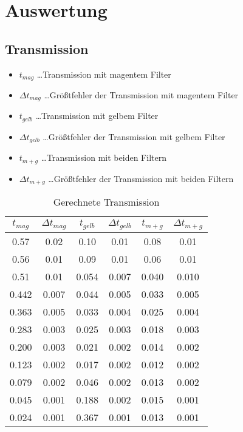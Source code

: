 \documentclass[a4paper]{article}
\begin{document}
\section{Auswertung}
\subsection{Transmission}
\begin{table}[ht]
				\centering
				\caption{Gerechnete Transmission}
        \begin{itemize}
          \item $t_{mag}$ \dots Transmission mit magentem Filter
          \item $\Delta t_{mag}$ \dots Größtfehler der Transmission mit magentem Filter
          \item $t_{gelb}$ \dots Transmission mit gelbem Filter 
          \item $\Delta t_{gelb}$ \dots Größtfehler der Transmission mit gelbem Filter
          \item $t_{m+g}$ \dots Transmission mit beiden Filtern 
          \item $\Delta t_{m+g}$ \dots Größtfehler der Transmission mit beiden Filtern
        \end{itemize}
				\begin{tabular}{|c|c|c|c|c|c|}
\hline
$t_{mag}$ & $\Delta t_{mag}$ & $t_{gelb}$ & $\Delta t_{gelb}$ & $t_{m+g}$ & $\Delta t_{m+g}$ \\
\hline
0.57 & 0.02 &    			0.10& 0.01&    				0.08& 0.01\\\hline
0.56 & 0.01 &    			0.09& 0.01&   				0.06& 0.01\\\hline
0.51 & 0.01 &   			0.054& 0.007&  				0.040& 0.010\\\hline
0.442 & 0.007 & 			0.044& 0.005&  				0.033& 0.005\\\hline
0.363 & 0.005 &  			0.033& 0.004&  				0.025& 0.004\\\hline
0.283 & 0.003 &  			0.025& 0.003&   			0.018& 0.003\\\hline
0.200 & 0.003 &  			0.021& 0.002&  				0.014& 0.002\\\hline
0.123 & 0.002 &  			0.017& 0.002&  				0.012& 0.002\\\hline
0.079 & 0.002 & 			0.046& 0.002&  				0.013& 0.002\\\hline
0.045 & 0.001 &  			0.188& 0.002&   			0.015& 0.001\\\hline
0.024 & 0.001 &  			0.367& 0.001&   			0.013& 0.001\\\hline

\end{tabular}
\end{table}
\end{document}
